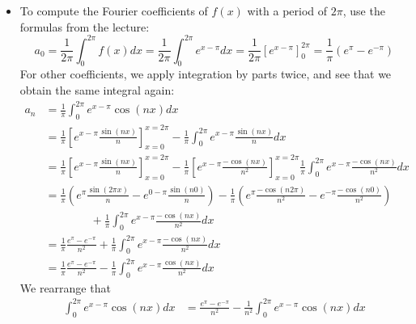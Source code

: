 \documentclass[11pt]{article}
\begin{document}
\begin{solution}     
    \begin{itemize}
    \item To compute the Fourier coefficients of $f(x)$ with a period of $2\pi$, use the formulas from the lecture:
    \[
        a_0 
        = 
        \frac{1}{2\pi}\int_{0}^{2\pi} f(x) dx  = \frac{1}{2\pi}\int_{0}^{2\pi} e^{x-\pi} dx  = \frac{1}{2\pi}\left[ e^{x-\pi} \right]_{0}^{2\pi} = \frac{1}{\pi}\left(e^{\pi} - e^{-\pi}\right)
    \]
    For other coefficients, we apply integration by parts twice, and see that we obtain the same integral again:
    \begin{align*}
        a_n 
        &
        = 
        \frac{1}{\pi}
        \int_{0}^{2\pi} e^{x - \pi} \cos( n x) dx
        \\&
        =
        \frac{1}{\pi}
        \left[ e^{x - \pi} \frac{ \sin(n x) }{ n } \right]_{x=0}^{x=2\pi}
        -
        \frac{1}{\pi}
        \int_{0}^{2\pi} e^{x-\pi}\frac{ \sin( n x) }{ n } dx
        \\&
        =
        \frac{1}{\pi}
        \left[ e^{x - \pi} \frac{ \sin(n x) }{ n } \right]_{x=0}^{x=2\pi}
        -
        \frac{1}{\pi}
        \left[ e^{x - \pi} \frac{ -\cos(n x) }{ n^2 } \right]_{x=0}^{x=2\pi}
        \frac{1}{\pi}
        \int_{0}^{2\pi} e^{x-\pi}\frac{ -\cos(n x) }{ n^2 } dx
        \\&
        =
        \frac{1}{\pi}
        \left( e^{\pi} \frac{ \sin(2\pi x) }{ n } - e^{0 - \pi} \frac{ \sin(n 0) }{ n } \right)
        -
        \frac{1}{\pi}
        \left( e^{\pi} \frac{ -\cos(n 2\pi) }{ n^2 } - e^{- \pi} \frac{ -\cos(n 0) }{ n^2 } \right)
        \\&\qquad\qquad
        +
        \frac{1}{\pi}
        \int_{0}^{2\pi} e^{x-\pi}\frac{ -\cos(n x) }{ n^2 } dx
        \\&
        =
        \frac{1}{\pi}\frac{e^{\pi} - e^{-\pi}}{n^2}
        +
        \frac{1}{\pi}
        \int_{0}^{2\pi} e^{x-\pi}\frac{ -\cos(n x) }{ n^2 } dx
        \\&
        =
        \frac{1}{\pi}\frac{e^{\pi} - e^{-\pi}}{n^2}
        -
        \frac{1}{\pi}
        \int_{0}^{2\pi} e^{x-\pi}\frac{ \cos(n x) }{ n^2 } dx
        \end{align*}
        We rearrange that 
        \begin{align*}
            \int_{0}^{2\pi} e^{x-\pi} \cos(n x) dx
            &=
            \frac{e^{\pi} - e^{-\pi}}{ n^2}
            -
            \frac{1}{n^2}
            \int_{0}^{2\pi} e^{x-\pi} \cos(n x) dx

\end{align*}
\end{itemize}
\end{solution}
\end{document}
